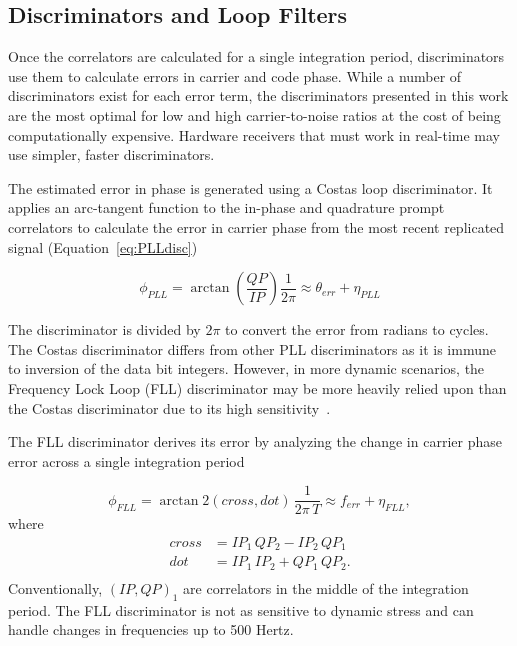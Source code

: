 \subsection{\textbf{Discriminators and Loop Filters}}
Once the correlators are calculated for a single integration period, discriminators use them to calculate errors in carrier and code phase. While a number of discriminators exist for each error term, the discriminators presented in this work are the most optimal for low and high carrier-to-noise ratios at the cost of being computationally expensive. Hardware receivers that must work in real-time may use simpler, faster discriminators.

The estimated error in phase is generated using a Costas loop discriminator. It applies an arc-tangent function to the in-phase and quadrature prompt correlators to calculate the error in carrier phase from the most recent replicated signal (Equation~\ref{eq:PLLdisc})

\begin{equation}\label{eq:PLLdisc}
    \phi_{PLL} = \arctan\left(\frac{QP}{IP}\right) \frac{1}{2\pi} \approx \theta_{err} + \eta_{PLL}
\end{equation}

The discriminator is divided by \(2 \pi \) to convert the error from radians to cycles. The Costas discriminator differs from other PLL discriminators as it is immune to inversion of the data bit integers. However, in more dynamic scenarios, the Frequency Lock Loop (FLL) discriminator may be more heavily relied upon than the Costas discriminator due to its high sensitivity~\cite{kaplanUnderstandingGPSPrinciples2006}.

The FLL discriminator derives its error by analyzing the change in carrier phase error across a single integration period

\begin{equation}\label{eq:FLLdisc}
    \phi_{FLL} = \arctan2\left(cross,dot\right) \, \frac{1}{2\pi \,T} \approx f_{err} + \eta_{FLL},
\end{equation}
where
\begin{equation}\label{eq:crossdot}
    \begin{split}
        cross & = IP_1\,QP_2 - IP_2\,QP_1\\
        dot & = IP_1\,IP_2 + QP_1\,QP_2. \\
    \end{split}
\end{equation}
Conventionally, \({\left(IP,QP\right)}_1\) are correlators in the middle of the integration period. The FLL discriminator is not as sensitive to dynamic stress and can handle changes in frequencies up to 500 Hertz.

